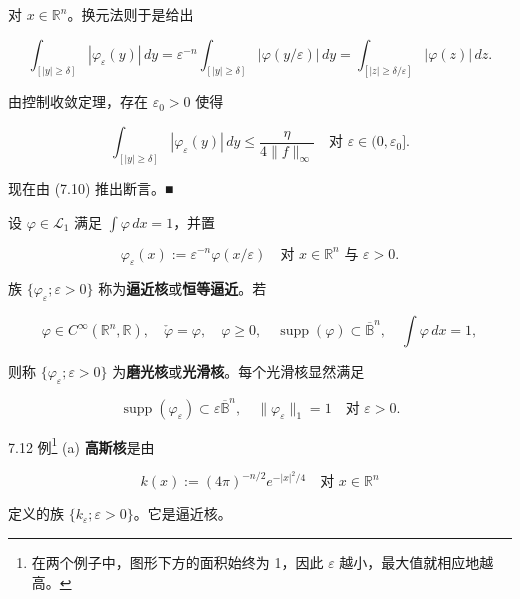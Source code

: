 \begin{theorem}
\begin{subitems}
对 $ x \in \mathbb{R}^{n} $。换元法则于是给出

\[
\int_{[|y|\ge\delta]}|\varphi_{\varepsilon}(y)|\,dy = \varepsilon^{-n}\int_{[|y|\ge\delta]}|\varphi(y/\varepsilon)|\,dy = \int_{[|z|\ge\delta/\varepsilon]}|\varphi(z)|\,dz .
\]

由控制收敛定理，存在 $ \varepsilon_{0} > 0 $ 使得

\[
\int_{[|y|\ge\delta]}|\varphi_{\varepsilon}(y)|\,dy \le \frac{\eta}{4\|f\|_{\infty}} \quad \text{对 } \varepsilon \in (0,\varepsilon_{0}] .
\]

现在由 (7.10) 推出断言。\nobreak\hspace{0.35em}■

\end{subitems}

\end{theorem}

设 $ \varphi \in \mathcal{L}_{1} $ 满足 $ \int\varphi\,dx = 1 $，并置

\begin{equation}
\varphi_{\varepsilon}(x) := \varepsilon^{-n}\varphi(x/\varepsilon) \quad \text{对 } x \in \mathbb{R}^{n} \text{ 与 } \varepsilon > 0 .\tag{7.11}
\end{equation}

族 $ \{\varphi_{\varepsilon} ; \varepsilon > 0\} $ 称为\textbf{逼近核}或\textbf{恒等逼近}。若

\[
\varphi \in C^{\infty}(\mathbb{R}^{n},\mathbb{R}) , \quad \check{\varphi} = \varphi , \quad \varphi \ge 0 , \quad \operatorname{supp}(\varphi) \subset \overline{\mathbb{B}}^{n} , \quad \int\varphi\,dx = 1 ,
\]

则称 $ \{\varphi_{\varepsilon} ; \varepsilon > 0\} $ 为\textbf{磨光核}或\textbf{光滑核}。每个光滑核显然满足

\[
\operatorname{supp}(\varphi_{\varepsilon}) \subset \varepsilon\overline{\mathbb{B}}^{n} , \quad \|\varphi_{\varepsilon}\|_{1} = 1 \quad \text{对 } \varepsilon > 0 .
\]

7.12 例\footnote{在两个例子中，图形下方的面积始终为 1，因此 $ \varepsilon $ 越小，最大值就相应地越高。} (a) \textbf{高斯核}是由

\[
k(x) := (4\pi)^{-n/2}e^{-|x|^{2}/4} \quad \text{对 } x \in \mathbb{R}^{n}
\]

定义的族 $ \{k_{\varepsilon} ; \varepsilon > 0\} $。它是逼近核。


